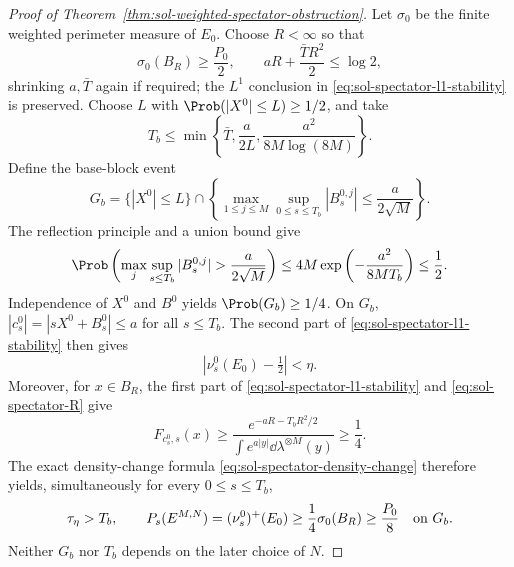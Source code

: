 \documentclass[../main.tex]{subfiles}
\begin{document}
\begin{proof}[Proof of Theorem~\ref{thm:sol-weighted-spectator-obstruction}]
Let $\sigma_0$ be the finite weighted perimeter measure of $E_0$.  Choose $R<\infty$ so that
\begin{equation}
  \sigma_0(B_R)\ge\frac{P_0}{2},
  \qquad
  aR+\frac{\bar T R^2}{2}\le\log2,
  \label{eq:sol-spectator-R}
\end{equation}
shrinking $a,\bar T$ again if required; the $L^1$ conclusion in
\eqref{eq:sol-spectator-l1-stability} is preserved.  Choose $L$ with
$\Prob(|X^0|\le L)\ge1/2$, and take
\begin{equation}
  T_b\le
  \min\left\{\bar T,\frac{a}{2L},
  \frac{a^2}{8M\log(8M)}\right\}.
  \label{eq:sol-spectator-Tb}
\end{equation}
Define the base-block event
\begin{equation}
  G_b=\{|X^0|\le L\}\cap
  \left\{
    \max_{1\le j\le M}\sup_{0\le s\le T_b}|B_s^{0,j}|
    \le\frac{a}{2\sqrt M}
  \right\}.
  \label{eq:sol-spectator-Gb}
\end{equation}
The reflection principle and a union bound give
\[
  \Prob\left(
    \max_j\sup_{s\le T_b}|B_s^{0,j}|>\frac{a}{2\sqrt M}
  \right)
  \le4M\exp\left(-\frac{a^2}{8MT_b}\right)\le\frac12.
\]
Independence of $X^0$ and $B^0$ yields $\Prob(G_b)\ge1/4$.  On $G_b$,
$|c_s^0|=|sX^0+B_s^0|\le a$ for all $s\le T_b$.  The second part of
\eqref{eq:sol-spectator-l1-stability} then gives
\[
  |\nu_s^0(E_0)-\tfrac12|<\eta.
\]
Moreover, for $x\in B_R$, the first part of
\eqref{eq:sol-spectator-l1-stability} and \eqref{eq:sol-spectator-R} give
\[
  F_{c_s^0,s}(x)
  \ge
  \frac{e^{-aR-T_bR^2/2}}
       {\int e^{a|y|}\dd\lambda^{\otimes M}(y)}
  \ge\frac14.
\]
The exact density-change formula \eqref{eq:sol-spectator-density-change} therefore yields,
simultaneously for every $0\le s\le T_b$,
\begin{equation}
  \tau_\eta>T_b,
  \qquad
  P_s(E^{M,N})=(\nu_s^0)^+(E_0)
  \ge\frac14\sigma_0(B_R)\ge\frac{P_0}{8}
  \quad\hbox{on }G_b.
  \label{eq:sol-spectator-base-stability}
\end{equation}
Neither $G_b$ nor $T_b$ depends on the later choice of $N$.


\end{proof}
\end{document}
